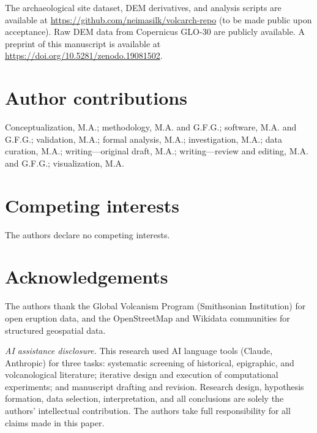 \documentclass[12pt,a4paper]{article}
\begin{document}
The archaeological site dataset, DEM derivatives, and analysis scripts are available at \url{https://github.com/neimasilk/volcarch-repo} (to be made public upon acceptance). Raw DEM data from Copernicus GLO-30 are publicly available. A preprint of this manuscript is available at \url{https://doi.org/10.5281/zenodo.19081502}.


\section*{Author contributions}

Conceptualization, M.A.; methodology, M.A. and G.F.G.; software, M.A. and G.F.G.; validation, M.A.; formal analysis, M.A.; investigation, M.A.; data curation, M.A.; writing---original draft, M.A.; writing---review and editing, M.A. and G.F.G.; visualization, M.A.

\section*{Competing interests}

The authors declare no competing interests.

\section*{Acknowledgements}

The authors thank the Global Volcanism Program (Smithsonian Institution) for open eruption data, and the OpenStreetMap and Wikidata communities for structured geospatial data.

\textit{AI assistance disclosure.} This research used AI language tools (Claude, Anthropic) for three tasks: systematic screening of historical, epigraphic, and volcanological literature; iterative design and execution of computational experiments; and manuscript drafting and revision. Research design, hypothesis formation, data selection, interpretation, and all conclusions are solely the authors' intellectual contribution. The authors take full responsibility for all claims made in this paper.




\end{document}
